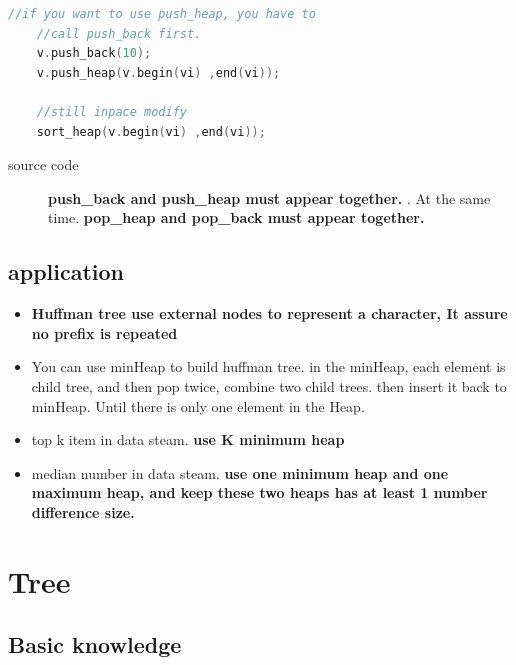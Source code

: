 \documentclass[a4paper,11pt,twoside]{book}
\begin{document}
\begin{itemize}
\begin{lstlisting}[frame=single, language=c++, mathescape=true]
	//if you want to use push_heap, you have to 
	//call push_back first. 
	v.push_back(10);
	v.push_heap(v.begin(vi) ,end(vi));
	
	//still inpace modify
	sort_heap(v.begin(vi) ,end(vi));
\end{lstlisting}
\begin{description}
	\item[source code] \textbf{push\_back and push\_heap must appear together. }. At the same time. \textbf{pop\_heap and pop\_back must appear together. }
\end{description}


\end{itemize}

\subsection{application}
\begin{itemize}
\item \textbf{Huffman tree use external nodes to represent a character, It assure no prefix is repeated }
\item You can use minHeap to build huffman tree. in the minHeap, each element is child tree, and then pop twice, combine two child trees. then insert it back to minHeap. Until there is only one element in the Heap. 

\item top k item in data steam. \textbf{use K minimum heap} 

\item median number in data steam. \textbf{use one minimum heap and one maximum heap, and keep these two heaps has at least 1 number difference size.} 
\end{itemize}

\section{Tree}
\subsection{Basic knowledge}
\end{document}

